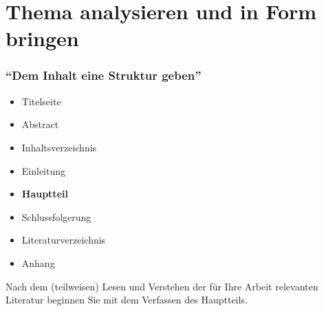 \section{Thema analysieren und in Form bringen}
\begin{frame}[fragile]
\frametitle{\enquote{Dem Inhalt eine Struktur geben}}

%
%
%
%
%    
%    

\begin{mybox}{}
	\onslide<2->
	\begin{itemize}
		\item<2-> Titelseite
		\item<3-> Abstract
		\item<4-> Inhaltsverzeichnis
		\item<5-> Einleitung
		\item<6-> \textbf{Hauptteil}
		\item<7-> Schlussfolgerung
		\item<8-> Literaturverzeichnis
		\item<9-> Anhang
	\end{itemize}
\end{mybox}
\textbf{}
	\begin{mybox}{}
	Nach dem (teilweisen) Lesen und Verstehen der für Ihre Arbeit relevanten Literatur 
	beginnen Sie mit dem Verfassen des Hauptteils.
\end{mybox}
\end{frame}

